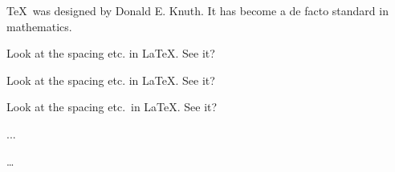 \documentclass{article}
\begin{document}
\TeX\ was designed by Donald E. Knuth.
It has become a de facto standard in mathematics.

Look at the spacing etc. in LaTeX. See it?

Look at the spacing etc. in LaTeX\@. See it?

Look at the spacing etc.\ in LaTeX\@. See it?

...

\ldots
\end{document}

